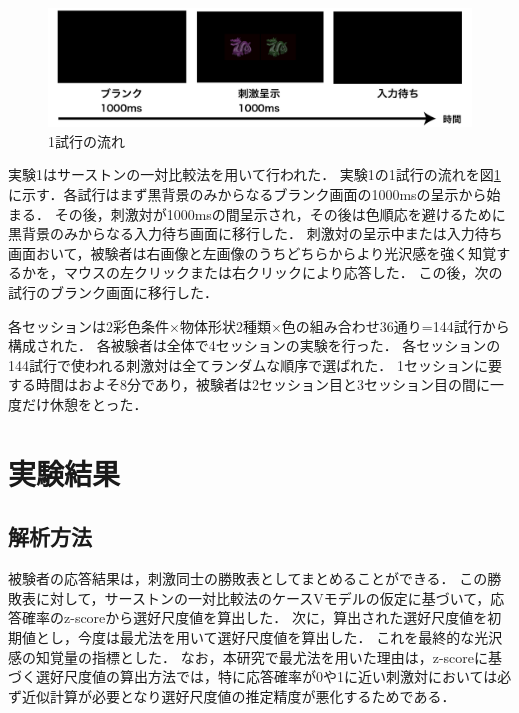             \begin{figure}[h]
                \centering
                \includegraphics[width=14.0cm]{./img/ex1_procedure.png}
                \caption{1試行の流れ}
                \label{ex1_procedure}
            \end{figure}

            実験1はサーストンの一対比較法を用いて行われた．
            実験1の1試行の流れを図\ref{ex1_procedure}に示す．各試行はまず黒背景のみからなるブランク画面の1000msの呈示から始まる．
            その後，刺激対が1000msの間呈示され，その後は色順応を避けるために黒背景のみからなる入力待ち画面に移行した．
            刺激対の呈示中または入力待ち画面おいて，被験者は右画像と左画像のうちどちらからより光沢感を強く知覚するかを，マウスの左クリックまたは右クリックにより応答した．
            この後，次の試行のブランク画面に移行した．

            各セッションは2彩色条件$\times$物体形状2種類$\times$色の組み合わせ36通り=144試行から構成された．
            各被験者は全体で4セッションの実験を行った．
            各セッションの144試行で使われる刺激対は全てランダムな順序で選ばれた．
            1セッションに要する時間はおよそ8分であり，被験者は2セッション目と3セッション目の間に一度だけ休憩をとった．



    \section{実験結果}
        \subsection{解析方法}
            被験者の応答結果は，刺激同士の勝敗表としてまとめることができる．
            この勝敗表に対して，サーストンの一対比較法のケースVモデルの仮定に基づいて，応答確率のz-scoreから選好尺度値を算出した．
            次に，算出された選好尺度値を初期値とし，今度は最尤法を用いて選好尺度値を算出した．
            これを最終的な光沢感の知覚量の指標とした．
            なお，本研究で最尤法を用いた理由は，z-scoreに基づく選好尺度値の算出方法では，特に応答確率が0や1に近い刺激対においては必ず近似計算が必要となり選好尺度値の推定精度が悪化するためである．
            
